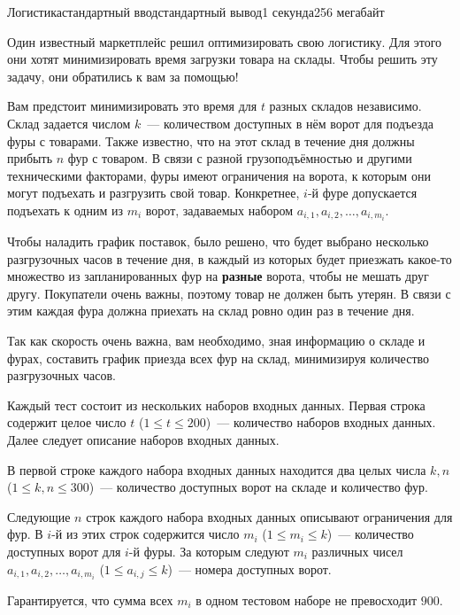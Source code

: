 \begin{problem}{Логистика}{стандартный ввод}{стандартный вывод}{1 секунда}{256 мегабайт}

    Один известный маркетплейс решил оптимизировать свою логистику. Для этого они хотят минимизировать время загрузки товара на склады. Чтобы решить эту задачу, они обратились к вам за помощью!

    Вам предстоит минимизировать это время для $t$ разных складов независимо. Склад задается числом $k$~--- количеством доступных в нём ворот для подъезда фуры с товарами. Также известно, что на этот склад в течение дня должны прибыть $n$ фур с товаром. В связи с разной грузоподъёмностью и другими техническими факторами, фуры имеют ограничения на ворота, к которым они могут подъехать и разгрузить свой товар. Конкретнее, $i$-й фуре допускается подъехать к одним из $m_i$ ворот, задаваемых набором $a_{i,1}, a_{i,2}, \ldots, a_{i,m_i}$.

    Чтобы наладить график поставок, было решено, что будет выбрано несколько разгрузочных часов в течение дня, в каждый из которых будет приезжать какое-то множество из запланированных фур на \textbf{разные} ворота, чтобы не мешать друг другу. Покупатели очень важны, поэтому товар не должен быть утерян. В связи с этим каждая фура должна приехать на склад ровно один раз в течение дня.

    Так как скорость очень важна, вам необходимо, зная информацию о складе и фурах, составить график приезда всех фур на склад, минимизируя количество разгрузочных часов.

    \InputFile
    Каждый тест состоит из нескольких наборов входных данных. Первая строка содержит целое число $t$ ($1 \leq t \leq 200$)~--- количество наборов входных данных. Далее следует описание наборов входных данных.

    В первой строке каждого набора входных данных находится два целых числа $k, n$ ($1 \leq k, n \leq 300$)~--- количество доступных ворот на складе и количество фур.

    Следующие $n$ строк каждого набора входных данных описывают ограничения для фур.
    В $i$-й из этих строк содержится число $m_i$ ($1 \leq m_i \leq k$)~--- количество доступных ворот для $i$-й фуры. За которым следуют $m_i$ различных чисел $a_{i, 1}, a_{i, 2}, \ldots, a_{i, m_i}$ ($1 \leq a_{i, j} \leq k$)~--- номера доступных ворот.

    Гарантируется, что сумма всех $m_i$ в одном тестовом наборе не превосходит $900$.


\end{problem}
